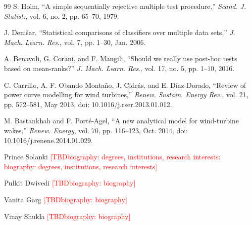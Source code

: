 \documentclass[journal,twoside]{IEEEtran}
\newcommand{\TBD}[1]{\textcolor{red}{[TBD\ifx\relax#1\relax\else: #1\fi]}}
\begin{document}
\begin{thebibliography}{99}
S. Holm, ``A simple sequentially rejective multiple test procedure,'' \textit{Scand. J. Statist.}, vol. 6, no. 2, pp. 65--70, 1979.

J. Dem\v{s}ar, ``Statistical comparisons of classifiers over multiple data sets,'' \textit{J. Mach. Learn. Res.}, vol. 7, pp. 1--30, Jan. 2006.

A. Benavoli, G. Corani, and F. Mangili, ``Should we really use post-hoc tests based on mean-ranks?'' \textit{J. Mach. Learn. Res.}, vol. 17, no. 5, pp. 1--10, 2016.

C. Carrillo, A. F. Obando Monta\~no, J. Cidr\'as, and E. D\'iaz-Dorado, ``Review of power curve modelling for wind turbines,'' \textit{Renew. Sustain. Energy Rev.}, vol. 21, pp. 572--581, May 2013, doi: 10.1016/j.rser.2013.01.012.

M. Bastankhah and F. Port\'e-Agel, ``A new analytical model for wind-turbine wakes,'' \textit{Renew. Energy}, vol. 70, pp. 116--123, Oct. 2014, doi: 10.1016/j.renene.2014.01.029.

\end{thebibliography}

\begin{IEEEbiographynophoto}{Prince Solanki}
\TBD{biography: degrees, institutions, research interests}
\end{IEEEbiographynophoto}

\begin{IEEEbiographynophoto}{Pulkit Dwivedi}
\TBD{biography}
\end{IEEEbiographynophoto}

\begin{IEEEbiographynophoto}{Vanita Garg}
\TBD{biography}
\end{IEEEbiographynophoto}

\begin{IEEEbiographynophoto}{Vinay Shukla}
\TBD{biography}
\end{IEEEbiographynophoto}
\end{document}
